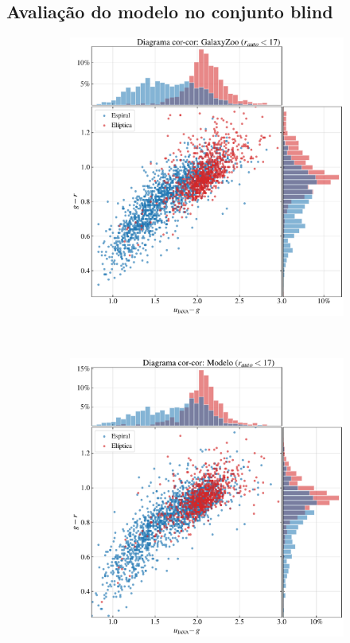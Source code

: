\newpage

\subsection{Avaliação do modelo no conjunto blind}
\label{section:result-blind}

\begin{figure}[!ht]%
  \centering
  \begin{subfigure}{.57\linewidth}
    \includegraphics[width=\linewidth]{figures/zoo170_color_color.pdf}
  \end{subfigure}\\[4pt]
  \begin{subfigure}{.57\linewidth}
    \includegraphics[width=\linewidth]{figures/mn170_color_color.pdf}

\end{subfigure}
\end{figure}
